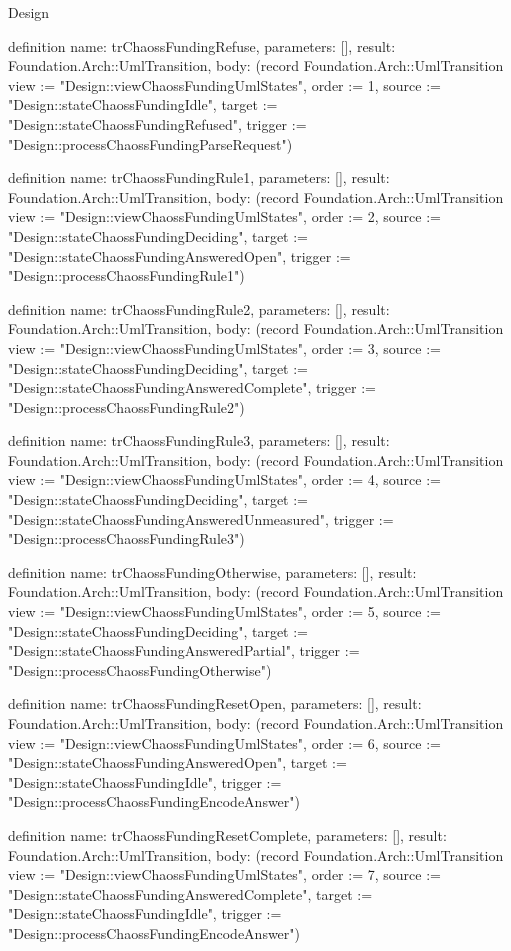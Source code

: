 \begin{lexlean}{Design}
\begin{semanticmodule}
definition{
  name: trChaossFundingRefuse,
  parameters: [],
  result: Foundation.Arch::UmlTransition,
  body: (record Foundation.Arch::UmlTransition {view := "Design::viewChaossFundingUmlStates", order := 1, source := "Design::stateChaossFundingIdle", target := "Design::stateChaossFundingRefused", trigger := "Design::processChaossFundingParseRequest"})
}

definition{
  name: trChaossFundingRule1,
  parameters: [],
  result: Foundation.Arch::UmlTransition,
  body: (record Foundation.Arch::UmlTransition {view := "Design::viewChaossFundingUmlStates", order := 2, source := "Design::stateChaossFundingDeciding", target := "Design::stateChaossFundingAnsweredOpen", trigger := "Design::processChaossFundingRule1"})
}

definition{
  name: trChaossFundingRule2,
  parameters: [],
  result: Foundation.Arch::UmlTransition,
  body: (record Foundation.Arch::UmlTransition {view := "Design::viewChaossFundingUmlStates", order := 3, source := "Design::stateChaossFundingDeciding", target := "Design::stateChaossFundingAnsweredComplete", trigger := "Design::processChaossFundingRule2"})
}

definition{
  name: trChaossFundingRule3,
  parameters: [],
  result: Foundation.Arch::UmlTransition,
  body: (record Foundation.Arch::UmlTransition {view := "Design::viewChaossFundingUmlStates", order := 4, source := "Design::stateChaossFundingDeciding", target := "Design::stateChaossFundingAnsweredUnmeasured", trigger := "Design::processChaossFundingRule3"})
}

definition{
  name: trChaossFundingOtherwise,
  parameters: [],
  result: Foundation.Arch::UmlTransition,
  body: (record Foundation.Arch::UmlTransition {view := "Design::viewChaossFundingUmlStates", order := 5, source := "Design::stateChaossFundingDeciding", target := "Design::stateChaossFundingAnsweredPartial", trigger := "Design::processChaossFundingOtherwise"})
}

definition{
  name: trChaossFundingResetOpen,
  parameters: [],
  result: Foundation.Arch::UmlTransition,
  body: (record Foundation.Arch::UmlTransition {view := "Design::viewChaossFundingUmlStates", order := 6, source := "Design::stateChaossFundingAnsweredOpen", target := "Design::stateChaossFundingIdle", trigger := "Design::processChaossFundingEncodeAnswer"})
}

definition{
  name: trChaossFundingResetComplete,
  parameters: [],
  result: Foundation.Arch::UmlTransition,
  body: (record Foundation.Arch::UmlTransition {view := "Design::viewChaossFundingUmlStates", order := 7, source := "Design::stateChaossFundingAnsweredComplete", target := "Design::stateChaossFundingIdle", trigger := "Design::processChaossFundingEncodeAnswer"})
}


\end{semanticmodule}
\end{lexlean}

